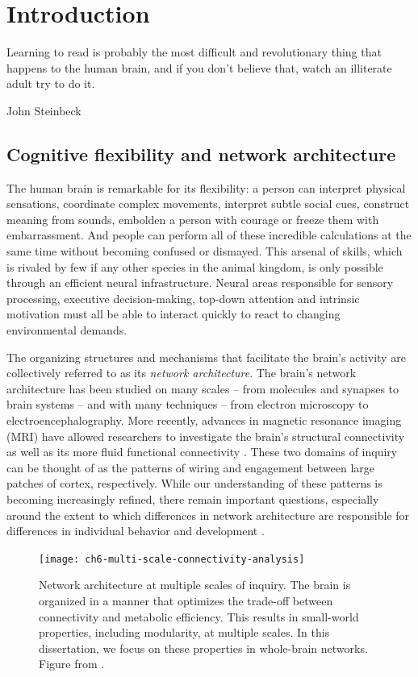 \chapter{Introduction}

\epigraph{Learning to read is probably the most difficult and revolutionary thing that happens to the human brain, and if you don't believe that, watch an illiterate adult try to do it.}{John Steinbeck}

\section{Cognitive flexibility and network architecture}

The human brain is remarkable for its flexibility: a person can interpret physical sensations, coordinate complex movements, interpret subtle social cues, construct meaning from sounds, embolden a person with courage or freeze them with embarrassment. And people can perform all of these incredible calculations at the same time without becoming confused or dismayed. This arsenal of skills, which is rivaled by few if any other species in the animal kingdom, is only possible through an efficient neural infrastructure. Neural areas responsible for sensory processing, executive decision-making, top-down attention and intrinsic motivation must all be able to interact quickly to react to changing environmental demands. 

The organizing structures and mechanisms that facilitate the brain's activity are collectively referred to as its \textit{network architecture}. The brain's network architecture has been studied on many scales -- from molecules and synapses to brain systems -- and with many techniques -- from electron microscopy to electroencephalography. More recently, advances in magnetic resonance imaging (MRI) have allowed researchers to investigate the brain's structural connectivity as well as its more fluid functional connectivity \citep{Betzel2013}. These two domains of inquiry can be thought of as the patterns of wiring and engagement between large patches of cortex, respectively. While our understanding of these patterns is becoming increasingly refined, there remain important questions, especially around the extent to which differences in network architecture are responsible for differences in individual behavior and development \citep{Petersen2015}.

\begin{figure}[t]
	\centering
	\texttt{[image: ch6-multi-scale-connectivity-analysis]}
	\caption[Network architecture at multiple scales]{Network architecture at multiple scales of inquiry. The brain is organized in a manner that optimizes the trade-off between connectivity and metabolic efficiency. This results in small-world properties, including modularity, at multiple scales. In this dissertation, we focus on these properties in whole-brain networks. Figure from \citep{Petersen2015}.}
	\label{fig:ch6-multi-scale-connectivity-analysis}
\end{figure}

